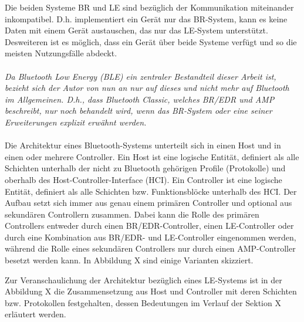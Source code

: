 Die beiden Systeme BR und LE sind bezüglich der Kommunikation miteinander inkompatibel. D.h. implementiert ein Gerät nur das BR-System, kann es keine Daten mit einem Gerät austauschen, das nur das LE-System unterstützt. Desweiteren ist es möglich, dass ein Gerät über beide Systeme verfügt und so die meisten Nutzungsfälle abdeckt.
\\\\
\textit{Da Bluetooth Low Energy (BLE) ein zentraler Bestandteil dieser Arbeit ist, bezieht sich der Autor von nun an nur auf dieses und nicht mehr auf Bluetooth im Allgemeinen. D.h., dass Bluetooth Classic, welches BR/EDR und AMP beschreibt, nur noch behandelt wird, wenn das BR-System oder eine seiner Erweiterungen explizit erwähnt werden.}
\\\\
Die Architektur eines Bluetooth-Systems unterteilt sich in einen Host und in einen oder mehrere Controller. Ein Host ist eine logische Entität, definiert als alle Schichten unterhalb der nicht zu Bluetooth gehörigen Profile (Protokolle) und oberhalb des Host-Controller-Interface (HCI). Ein Controller ist eine logische Entität, definiert als alle Schichten bzw. Funktionsblöcke unterhalb des HCI. Der Aufbau setzt sich immer aus genau einem primären Controller und optional aus sekundären Controllern zusammen. Dabei kann die Rolle des primären Controllers entweder durch einen BR/EDR-Controller, einen LE-Controller oder durch eine Kombination aus BR/EDR- und LE-Controller eingenommen werden, während die Rolle eines sekundären Controllers nur durch einen AMP-Controller besetzt werden kann. In Abbildung X
 sind einige Varianten skizziert. 


Zur Veranschaulichung der Architektur bezüglich eines LE-Systems ist in der Abbildung X
die Zusammensetzung aus Host und Controller mit deren Schichten bzw. Protokollen festgehalten, dessen Bedeutungen im Verlauf der Sektion X
erläutert werden.

